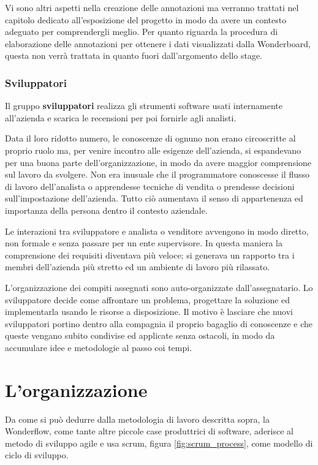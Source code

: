 Vi sono altri aspetti nella creazione delle annotazioni ma verranno trattati
nel capitolo dedicato all'esposizione del progetto in modo da avere un contesto
adeguato per comprendergli meglio. Per quanto riguarda la procedura di
elaborazione delle annotazioni per ottenere i dati visualizzati dalla
Wonderboard, questa non verrà trattata in quanto fuori dall'argomento dello
stage.

\subsubsection{Sviluppatori}
Il gruppo \textbf{sviluppatori} realizza gli strumenti software usati
internamente all'azienda e scarica le recensioni per poi fornirle agli analisti.
\newline

Data il loro ridotto numero, le conoscenze di ognuno non erano circoscritte al
proprio ruolo ma, per venire incontro alle esigenze dell'azienda, si
espandevano per una buona parte dell'organizzazione, in modo da avere maggior
comprensione sul lavoro da svolgere. Non era inusuale che il programmatore
conoscesse il flusso di lavoro dell'analista o apprendesse tecniche di vendita
o prendesse decisioni sull'impostazione dell'azienda. Tutto ciò aumentava il
senso di appartenenza ed importanza della persona dentro il contesto aziendale.
\newline

Le interazioni tra sviluppatore e analista o venditore avvengono in modo
diretto, non formale e senza passare per un ente supervisore. In questa maniera
la comprensione dei requisiti diventava più veloce; si generava un rapporto tra
i membri dell'azienda più stretto ed un ambiente di lavoro più rilassato.
\newline

L'organizzazione dei compiti assegnati sono auto-organizzate dall'assegnatario.
Lo sviluppatore decide come affrontare un problema, progettare la soluzione ed
implementarla usando le risorse a disposizione. Il motivo è lasciare che nuovi
sviluppatori portino dentro alla compagnia il proprio bagaglio di conoscenze e
che queste vengano subito condivise ed applicate senza ostacoli, in modo da
accumulare idee e metodologie al passo coi tempi.

\section{L'organizzazione}
Da come si può dedurre dalla metodologia di lavoro descritta sopra, la
Wonderflow, come tante altre piccole case produttrici di software, aderisce
al metodo di sviluppo \gls{agile} e usa \gls{scrum}, figura
\ref{fig:scrum_process}, come modello di ciclo di sviluppo.


